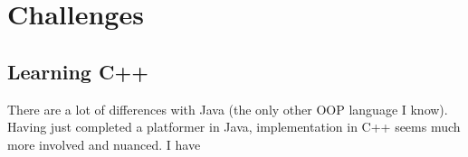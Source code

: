 \documentclass[11pt, a4paper, oneside]{article} %
\begin{document}
\section{Challenges}

\subsection{Learning C++}

There are a lot of differences with Java (the only other OOP language I know).
Having just completed a platformer in Java, implementation in C++ seems much
more involved and nuanced. I have
\end{document}
